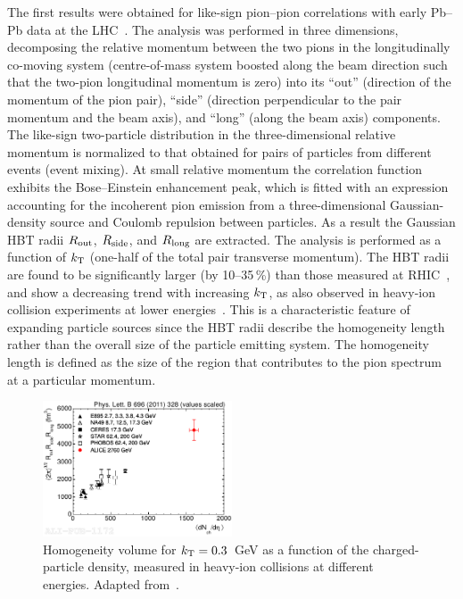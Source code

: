 The first results were obtained for like-sign pion--pion correlations with early Pb--Pb data at the LHC~\cite{Aamodt:2011mr}. The analysis was performed in three dimensions, decomposing the relative momentum between the two pions in the longitudinally co-moving system (centre-of-mass system boosted along the beam direction such that the two-pion longitudinal momentum is zero) into its ``out'' (direction of the momentum of the pion pair), ``side'' (direction perpendicular to the pair momentum and the beam axis), and ``long'' (along the beam axis) components. The like-sign two-particle distribution in the three-dimensional relative momentum is normalized to that obtained for pairs of particles from different events (event mixing). At small relative momentum the correlation function exhibits the Bose--Einstein enhancement peak, which is fitted with an expression accounting for the incoherent pion emission from a three-dimensional Gaussian-density source and Coulomb repulsion between particles. As a result the Gaussian HBT radii $R_{\rm out}$, $R_{\rm side}$, and $R_{\rm long}$ are extracted. The analysis is performed as a function of $k_{\rm T}$ (one-half of the total pair transverse momentum). The HBT radii are found to be significantly larger (by 10--35\,\%) than those measured at RHIC~\cite{Adams:2004yc}, and show a decreasing trend with increasing $k_{\rm T}$, as also observed in heavy-ion collision experiments at lower energies~\cite{Lisa:2005dd}. This is a characteristic feature of expanding particle sources since the HBT radii describe the homogeneity length rather than the overall size of the particle emitting system. The homogeneity length is defined as the size of the region that contributes to the pion spectrum at a particular momentum.

\begin{figure}
\centering
\includegraphics[width=0.5\textwidth]{ksfigures/HBTVolumeVsDensity.pdf}
\caption{Homogeneity volume for $k_{\rm T} = 0.3$~GeV as a function of the charged-particle density, measured in heavy-ion collisions at different energies. Adapted from~\cite{Aamodt:2011mr}.}
\label{figks:HBTvolume}
\end{figure}

